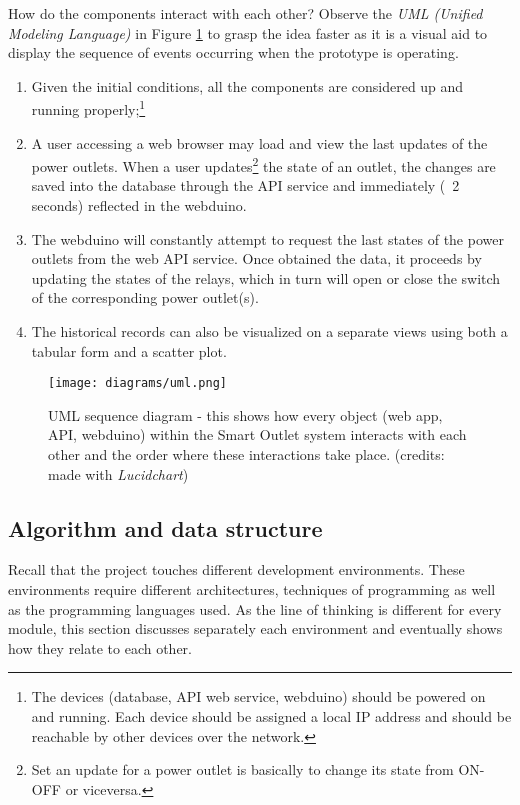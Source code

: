 \noindent
How do the components interact with each other? Observe the \emph{UML (Unified Modeling Language)} in Figure \ref{fig:uml-diagram} to grasp the idea faster as it is a visual aid to display the sequence of events occurring when the prototype is operating.
\begin{enumerate}
    \item Given the initial conditions, all the components are considered up and running properly;\footnote{The devices (database, API web service, webduino) should be powered on and running. Each device should be assigned a local IP address and should be reachable by other devices over the network.}
    \item A user accessing a web browser may load and view the last updates of the power outlets. When a user updates\footnote{Set an update for a power outlet is basically to change its state from ON-OFF or viceversa.} the state of an outlet, the changes are saved into the database through the API service and immediately (~2 seconds) reflected in the webduino.
    \item The webduino will constantly attempt to request the last states of the power outlets from the web API service. Once obtained the data, it proceeds by updating the states of the relays, which in turn will open or close the switch of the corresponding power outlet(s).
    \item The historical records can also be visualized on a separate views using both a tabular form and a scatter plot.
\end{enumerate}

\begin{figure}[ht!]
    \centering
    \texttt{[image: diagrams/uml.png]}
    \caption{UML sequence diagram - this shows how every object (web app, API, webduino) within the Smart Outlet system interacts with each other and the order where these interactions take place. (credits: made with \emph{Lucidchart})}
    \label{fig:uml-diagram}
\end{figure}

\subsection{Algorithm and data structure}
Recall that the project touches different development environments. These environments require different architectures, techniques of programming as well as the programming languages used. As the line of thinking is different for every module, this section discusses separately each environment and eventually shows how they relate to each other.

